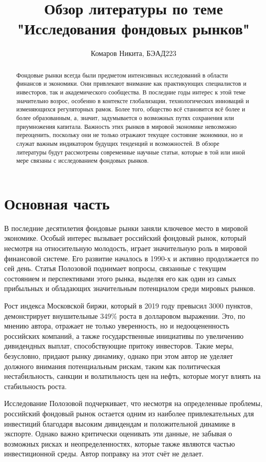 \documentclass[14pt]{extarticle}
\title{Обзор литературы по теме "Исследования фондовых рынков"}
\author{Комаров Никита, БЭАД223}
\date{}
\begin{document}
\maketitle

\begin{abstract}
Фондовые рынки всегда были предметом интенсивных исследований в области финансов и экономики. Они привлекают внимание как практикующих специалистов и инвесторов, так и академического сообщества. В последние годы интерес к этой теме значительно возрос, особенно в контексте глобализации, технологических инноваций и изменяющихся регуляторных рамок. Более того, общество всё становится всё более и более образованным, а, значит, задумывается о возможных путях сохранения или приумножения капитала. Важность этих рынков в мировой экономике невозможно переоценить, поскольку они не только отражают текущее состояние экономики, но и служат важным индикатором будущих тенденций и возможностей. В обзоре литературы будут рассмотрены современные научные статьи, которые в той или иной мере связаны с исследованием фондовых рынков. 
\end{abstract}

\section{Основная часть}


В последние десятилетия фондовые рынки заняли ключевое место в мировой экономике. Особый интерес вызывает российский фондовый рынок, который несмотря на относительную молодость, играет значительную роль в мировой финансовой системе. Его развитие началось в 1990-х и активно продолжается по сей день.
Статья Полозовой \cite{1} поднимает вопросы, связанные с текущим состоянием и перспективами этого рынка, выделяя его как один из самых прибыльных и обладающих значительным потенциалом среди мировых рынков.

Рост индекса Московской биржи, который в 2019 году превысил 3000 пунктов, демонстрирует внушительные 349\% роста в долларовом выражении. Это, по мнению автора, отражает не только уверенность, но и недооцененность российских компаний, а также государственные инициативы по увеличению дивидендных выплат, способствующие притоку инвесторов. Такие меры, безусловно, придают рынку динамику, однако при этом автор не уделяет должного внимания потенциальным рискам, таким как политическая нестабильность, санкции и волатильность цен на нефть, которые могут влиять на стабильность роста.

Исследование Полозовой подчеркивает, что несмотря на определенные проблемы, российский фондовый рынок остается одним из наиболее привлекательных для инвестиций благодаря высоким дивидендам и положительной динамике в экспорте. Однако важно критически оценивать эти данные, не забывая о возможных рисках и неопределенностях, которые также являются частью инвестиционной среды. Автор поправку на этот счёт не делает.
\end{document}
